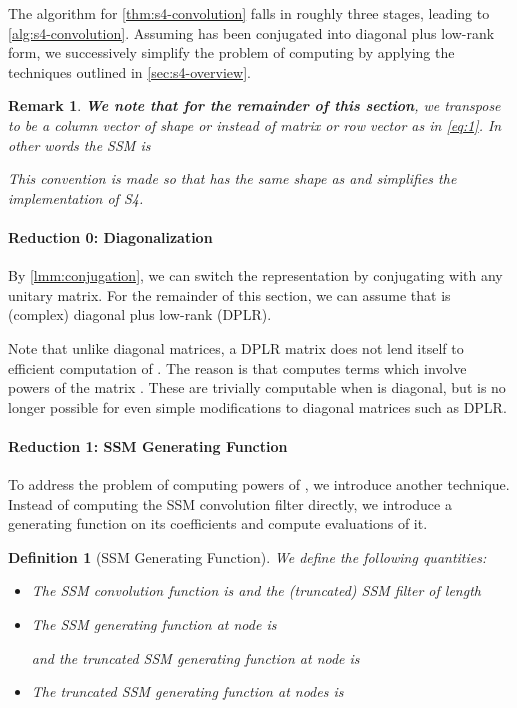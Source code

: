 \documentclass{article}
\newtheorem{definition}{Definition}
\newtheorem{remark}[lemma]{Remark}
\begin{document}
The algorithm for \cref{thm:s4-convolution} falls in roughly three stages, leading to \cref{alg:s4-convolution}.
Assuming  has been conjugated into diagonal plus low-rank form, we successively simplify the problem of computing 
by applying the techniques outlined in \cref{sec:s4-overview}.

\begin{remark}
  \textbf{We note that for the remainder of this section}, we transpose  to be a column vector of shape  or  instead of matrix or row vector  as in \eqref{eq:1}.
  In other words the SSM is
  
  This convention is made so that  has the same shape as  and simplifies the implementation of S4.
\end{remark}

\paragraph{Reduction 0: Diagonalization}
By \cref{lmm:conjugation}, we can switch the representation by conjugating with any unitary matrix.
For the remainder of this section, we can assume that  is (complex) diagonal plus low-rank (DPLR).

Note that unlike diagonal matrices, a DPLR matrix does not lend itself to efficient computation of .
The reason is that  computes terms  which involve powers of the matrix .
These are trivially computable when  is diagonal, but is no longer possible for even simple modifications to diagonal matrices such as DPLR.

\paragraph{Reduction 1: SSM Generating Function}

To address the problem of computing powers of , we introduce another technique.
Instead of computing the SSM convolution filter  directly,
we introduce a generating function on its coefficients and compute evaluations of it.

\begin{definition}[SSM Generating Function]\label{def:generating-function}
  We define the following quantities:
  \begin{itemize}\item The \emph{SSM convolution function} is 
      and the (truncated) SSM filter of length 
      
    \item The \emph{SSM generating function} at node  is
      
      and the \emph{truncated SSM generating function} at node  is
      
    \item The truncated SSM generating function at nodes  is
      

  \end{itemize}
\end{definition}
\end{document}

